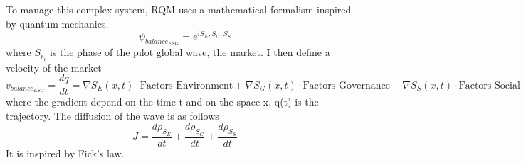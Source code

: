 \documentclass{article}
\begin{document}
To manage this complex system, RQM uses a mathematical formalism inspired by quantum mechanics.
\begin{equation}
    \psi_{balance_{ESG}} = e^{iS_{E}, S_{G}, S_{S}}
\end{equation}
where $S_{r_i}$ is the phase of the pilot global wave, the market.
I then define a velocity of the market
\begin{equation}
   v_{balance_{ESG}} =  \frac{dq}{dt} =  \nabla{S_{E}(x, t)} \cdot {\text{Factors Environment}} + \nabla{S_{G}(x, t)} \cdot {\text{Factors Governance}} + \nabla{S_{S}(x, t)} \cdot {\text{Factors Social}}
\end{equation}
where the gradient depend on the time t and on the space x. q(t) is the trajectory.
The diffusion of the wave is as follows
\begin{equation}
    J = \frac{d \rho_{S_E}}{dt} + \frac{d \rho_{S_G}}{dt} + \frac{d \rho_{S_S}}{dt}
\end{equation}
It is inspired by Fick's law.
\end{document}
